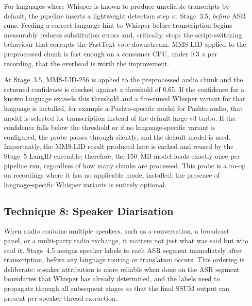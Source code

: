\documentclass[conference]{IEEEtran}
\begin{document}
For languages where Whisper is known to produce unreliable transcripts by default, the pipeline inserts a lightweight detection step at Stage~3.5, \textit{before} ASR runs. Feeding a correct language hint to Whisper before transcription begins measurably reduces substitution errors and, critically, stops the script-switching behaviour that corrupts the FastText vote downstream. MMS-LID applied to the preprocessed chunk is fast enough on a consumer CPU, under 0.3~s per recording, that the overhead is worth the improvement.

At Stage~3.5, MMS-LID-256 is applied to the preprocessed audio chunk and the returned confidence is checked against a threshold of 0.65. If the confidence for a known language exceeds this threshold and a fine-tuned Whisper variant for that language is installed, for example a Pashto-specific model for Pashto audio, that model is selected for transcription instead of the default large-v3-turbo. If the confidence falls below the threshold or if no language-specific variant is configured, the probe passes through silently, and the default model is used. Importantly, the MMS-LID result produced here is cached and reused by the Stage~5 LangID ensemble; therefore, the 150~MB model loads exactly once per pipeline run, regardless of how many chunks are processed. This probe is a no-op on recordings where it has no applicable model installed; the presence of language-specific Whisper variants is entirely optional.

\subsection{Technique 8: Speaker Diarisation}
\label{sec:diar}

When audio contains multiple speakers, such as a conversation, a broadcast panel, or a multi-party radio exchange, it matters not just what was said but who said it. Stage~4.5 assigns speaker labels to each ASR segment immediately after transcription, before any language routing or translation occurs. This ordering is deliberate: speaker attribution is more reliable when done on the ASR segment boundaries that Whisper has already determined, and the labels need to propagate through all subsequent stages so that the final SSUM output can present per-speaker thread extraction.
\end{document}
